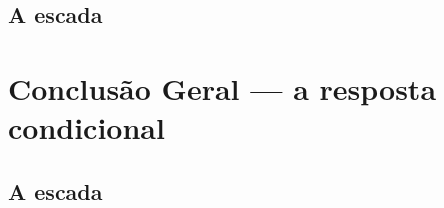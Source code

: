 \documentclass{beamer}
\begin{document}
\subsection{A escada}



\section[Conclusão]{Conclusão Geral --- a resposta condicional}


\subsection{A escada}
\end{document}
